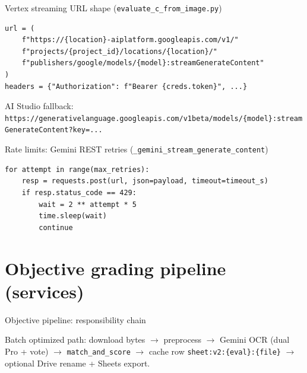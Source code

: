 \documentclass[aspectratio=169]{beamer}
\begin{document}
\begin{frame}[fragile]{Vertex streaming URL shape (\texttt{evaluate\_c\_from\_image.py})}
\begin{lstlisting}[style=py]
url = (
    f"https://{location}-aiplatform.googleapis.com/v1/"
    f"projects/{project_id}/locations/{location}/"
    f"publishers/google/models/{model}:streamGenerateContent"
)
headers = {"Authorization": f"Bearer {creds.token}", ...}
\end{lstlisting}
\vfill
\tiny AI Studio fallback: \texttt{https://generativelanguage.googleapis.com/v1beta/models/\{model\}:streamGenerateContent?key=...}
\end{frame}

\begin{frame}[fragile]{Rate limits: Gemini REST retries (\texttt{\_gemini\_stream\_generate\_content})}
\begin{lstlisting}[style=py]
for attempt in range(max_retries):
    resp = requests.post(url, json=payload, timeout=timeout_s)
    if resp.status_code == 429:
        wait = 2 ** attempt * 5
        time.sleep(wait)
        continue
\end{lstlisting}
\end{frame}

\section{Objective grading pipeline (services)}

\begin{frame}{Objective pipeline: responsibility chain}
  \centering

  \vspace{0.5em}
  \footnotesize
  Batch optimized path: download bytes $\rightarrow$ preprocess $\rightarrow$ Gemini OCR (dual Pro + vote) $\rightarrow$ \texttt{match\_and\_score} $\rightarrow$ cache row \texttt{sheet:v2:\{eval\}:\{file\}} $\rightarrow$ optional Drive rename + Sheets export.
\end{frame}
\end{document}
